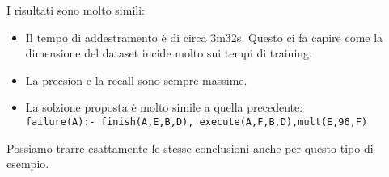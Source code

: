 I risultati sono molto simili:
\begin{itemize}
    \item Il tempo di addestramento è di circa 3m32s. Questo ci fa capire come la dimensione del dataset incide molto sui tempi di training.
    \item La precsion e la recall sono sempre massime.
    \item La solzione proposta è molto simile a quella precedente: \\ \texttt{failure(A):- finish(A,E,B,D), execute(A,F,B,D),mult(E,96,F)}
\end{itemize}

\myskip

Possiamo trarre esattamente le stesse conclusioni anche per questo tipo di esempio.